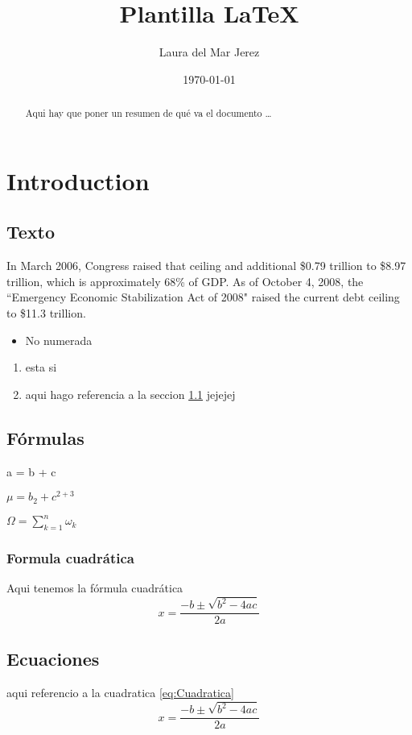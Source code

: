 \documentclass[12pt]{scrartcl}
\title{Plantilla \LaTeX}
\author{Laura del Mar Jerez}
\date{\today}
\begin{document}
\maketitle
\tableofcontents
\newpage


\begin{abstract}
    Aqui hay que poner un resumen de qué va el documento \ldots
\end{abstract}

\section{Introduction}
\subsection{Texto}
\label{sec:intro}In March 2006, Congress raised that ceiling and additional \$0.79 trillion to \$8.97 trillion, which is approximately 68\% of GDP. As of October 4, 2008, the ``Emergency Economic Stabilization Act of 2008" raised the current debt ceiling to \$11.3 trillion.

\begin{itemize} %
    \item No numerada
\end{itemize}

\begin{enumerate} %
    \item esta si
    \item aqui hago referencia a la seccion \ref{sec:intro} jejejej
\end{enumerate}

\subsection{Fórmulas}

a = b + c

$ \mu = b_2 + c^{2+3} $

$\Omega=\sum_{k=1}^{n}\omega_k$

\subsubsection*{Formula cuadrática}
 Aqui tenemos la fórmula cuadrática
\begin{equation}
\label{eq:Cuadratica}
   x = \frac{-b \pm \sqrt{b^2 -4ac}}{2a} 
\end{equation}



\subsection{Ecuaciones}
aqui referencio a la cuadratica \eqref{eq:Cuadratica}
\begin{equation}
    x = \frac{-b \pm \sqrt{b^2 -4ac}}{2a}
\end{equation}
\end{document}
